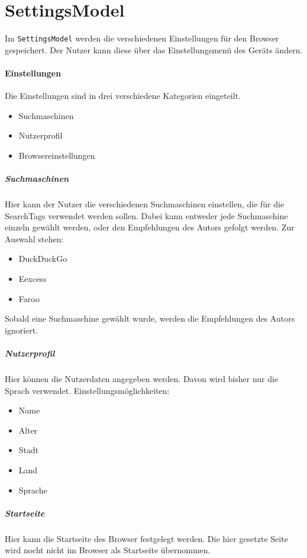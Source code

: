 \section{SettingsModel}
Im \lstinline|SettingsModel| werden die verschiedenen Einstellungen für den Browser gespeichert.
Der Nutzer kann diese über das Einstellungsmenü des Geräts ändern.

\paragraph{Einstellungen}  

Die Einstellungen sind in drei verschiedene Kategorien eingeteilt.
\begin{itemize}  
     \item Suchmaschinen  
     \item Nutzerprofil
     \item Browsereinstellungen
\end{itemize}

\subparagraph{Suchmaschinen}  

Hier kann der Nutzer die verschiedenen Suchmaschinen einstellen, die für die SearchTags verwendet werden sollen.
Dabei kann entweder jede Suchmaschine einzeln gewählt werden, oder den Empfehlungen des Autors gefolgt werden.
Zur Auswahl stehen:
\begin{itemize}  
     \item DuckDuckGo
     \item Eexcess
     \item Faroo  
\end{itemize}
Sobald eine Suchmaschine gewählt wurde, werden die Empfehlungen des Autors ignoriert.

\subparagraph{Nutzerprofil}  
Hier können die Nutzerdaten angegeben werden.
Davon wird bisher nur die Sprach verwendet.
Einstellungsmöglichkeiten:
\begin{itemize}  
     \item Name  
     \item Alter  
     \item Stadt
     \item Land
     \item Sprache
\end{itemize}

\subparagraph{Startseite}  
Hier kann die Startseite des Browser festgelegt werden.
Die hier gesetzte Seite wird nocht nicht im Browser als Startseite übernommen.
